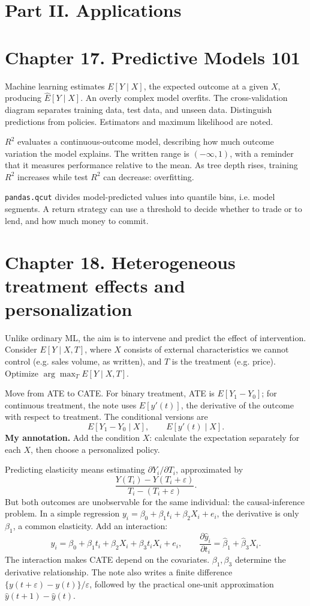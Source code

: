 \section{Part II. Applications}
\section{Chapter 17. Predictive Models 101}
Machine learning estimates $E[Y\mid X]$, the expected outcome at a given $X$, producing $\widehat E[Y\mid X]$. An overly complex model overfits. The cross-validation diagram separates training data, test data, and unseen data. Distinguish predictions from policies. Estimators and maximum likelihood are noted.

$R^2$ evaluates a continuous-outcome model, describing how much outcome variation the model explains. The written range is $(-\infty,1)$, with a reminder that it measures performance relative to the mean. As tree depth rises, training $R^2$ increases while test $R^2$ can decrease: overfitting.

\texttt{pandas.qcut} divides model-predicted values into quantile bins, i.e. model segments. A return strategy can use a threshold to decide whether to trade or to lend, and how much money to commit.

\section{Chapter 18. Heterogeneous treatment effects and personalization}
Unlike ordinary ML, the aim is to intervene and predict the effect of intervention. Consider $E[Y\mid X,T]$, where $X$ consists of external characteristics we cannot control (e.g. sales volume, as written), and $T$ is the treatment (e.g. price). Optimize $\arg\max_T E[Y\mid X,T]$.

Move from ATE to CATE. For binary treatment, ATE is $E[Y_1-Y_0]$; for continuous treatment, the note uses $E[y'(t)]$, the derivative of the outcome with respect to treatment. The conditional versions are
\[E[Y_1-Y_0\mid X],\qquad E[y'(t)\mid X].\]
\textbf{My annotation.} Add the condition $X$: calculate the expectation separately for each $X$, then choose a personalized policy.

Predicting elasticity means estimating $\partial Y_i/\partial T_i$, approximated by
\[\frac{Y(T_i)-Y(T_i+\varepsilon)}{T_i-(T_i+\varepsilon)}.\]
But both outcomes are unobservable for the same individual: the causal-inference problem. In a simple regression $y_i=\beta_0+\beta_1t_i+\beta_2X_i+e_i$, the derivative is only $\beta_1$, a common elasticity. Add an interaction:
\[y_i=\beta_0+\beta_1t_i+\beta_2X_i+\beta_3t_iX_i+e_i,
\qquad \frac{\partial\hat y_i}{\partial t_i}=\hat\beta_1+\hat\beta_3X_i.
\]
The interaction makes CATE depend on the covariates. $\beta_1,\beta_3$ determine the derivative relationship. The note also writes a finite difference $\{y(t+\varepsilon)-y(t)\}/\varepsilon$, followed by the practical one-unit approximation $\hat y(t+1)-\hat y(t)$.

